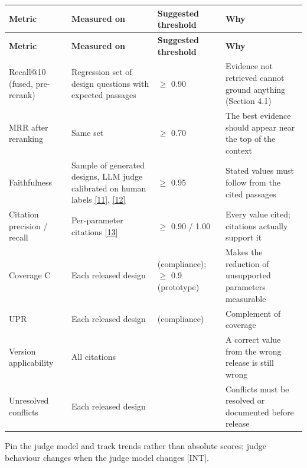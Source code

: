 \documentclass[11pt,a4paper]{article}
\newcommand{\prov}[1]{\textsf{\footnotesize[#1]}}
\begin{document}
{\small
\begin{longtable}{>{\raggedright\arraybackslash}p{}>{\raggedright\arraybackslash}p{}>{\raggedright\arraybackslash}p{}>{\raggedright\arraybackslash}p{}}
\toprule
\rowcolor{headbg} \textbf{Metric} & \textbf{Measured on} & \textbf{Suggested threshold} & \textbf{Why} \\
\midrule
\endfirsthead
\toprule
\rowcolor{headbg} \textbf{Metric} & \textbf{Measured on} & \textbf{Suggested threshold} & \textbf{Why} \\
\midrule
\endhead
\bottomrule
\endlastfoot
Recall@10 (fused, pre-rerank) & Regression set of design questions with expected passages & \ensuremath{\geq} 0.90 & Evidence not retrieved cannot ground anything (Section 4.1) \\ \arrayrulecolor{rulec}\hline\arrayrulecolor{black}
MRR after reranking & Same set & \ensuremath{\geq} 0.70 & The best evidence should appear near the top of the context \\ \arrayrulecolor{rulec}\hline\arrayrulecolor{black}
Faithfulness & Sample of generated designs, LLM judge calibrated on human labels \hyperlink{ref11}{[11]}, \hyperlink{ref12}{[12]} & \ensuremath{\geq} 0.95 & Stated values must follow from the cited passages \\ \arrayrulecolor{rulec}\hline\arrayrulecolor{black}
Citation precision / recall & Per-parameter citations \hyperlink{ref13}{[13]} & \ensuremath{\geq} 0.90 / 1.00 & Every value cited; citations actually support it \\ \arrayrulecolor{rulec}\hline\arrayrulecolor{black}
Coverage C & Each released design & 1.00 (compliance); \ensuremath{\geq} 0.9 (prototype) & Makes the reduction of unsupported parameters measurable \\ \arrayrulecolor{rulec}\hline\arrayrulecolor{black}
UPR & Each released design & 0 (compliance) & Complement of coverage \\ \arrayrulecolor{rulec}\hline\arrayrulecolor{black}
Version applicability & All citations & 1.00 & A correct value from the wrong release is still wrong \\ \arrayrulecolor{rulec}\hline\arrayrulecolor{black}
Unresolved conflicts & Each released design & 0 & Conflicts must be resolved or documented before release \\
\end{longtable}
}
Pin the judge model and track trends rather than absolute scores; judge behaviour changes when the judge model changes \prov{INT}.
\end{document}
